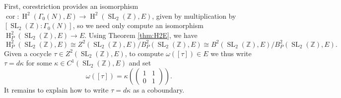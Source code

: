 \documentclass[10pt]{amsart}
\theoremstyle{plain}
\theoremstyle{definition}
\newcommand{\ZZ}{{\mathbb{Z}}}
\DeclareMathOperator{\SL}{SL}
\DeclareMathOperator{\Hh}{H}
\DeclareMathOperator{\cor}{cor}
\begin{document}
First, corestriction provides an isomorphism $\cor : \Hh^2(\Gamma_0(N), E) \to \Hh^2(\SL_2(\ZZ), E)$, given by multiplication by $[\SL_2(\ZZ) : \Gamma_0(N)]$,  so we need only compute an isomorphism $\Hh^2_P(\SL_2(\ZZ), E) \to E$.  Using Theorem \ref{thm:H2E}, we have
\[
\Hh^2_P(\SL_2(\ZZ), E) \cong Z^2(\SL_2(\ZZ), E) / B^2_P(\SL_2(\ZZ), E) \cong B^2(\SL_2(\ZZ), E) / B^2_P(\SL_2(\ZZ), E).
\]
Given a cocycle $\tau \in Z^2(\SL_2(\ZZ), E)$, to compute $\omega([\tau]) \in E$ we thus write $\tau = d\kappa$ for some $\kappa \in C^1(\SL_2(\ZZ), E)$ and set
\[
\omega([\tau]) = \kappa\left( \begin{pmatrix} 1 & 1 \\ 0 & 1 \end{pmatrix}\right).
\]
It remains to explain how to write $\tau = d\kappa$ as a coboundary.
\end{document}
